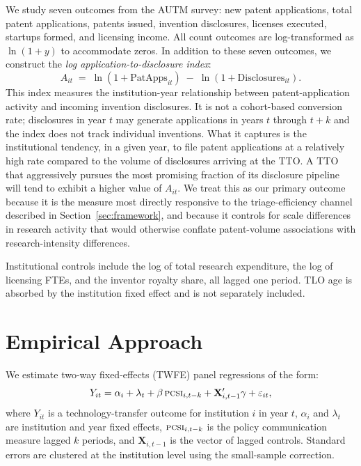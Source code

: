 \documentclass[12pt]{article}
\newcommand{\PCSI}{\textsc{pcsi}}
\begin{document}
We study seven outcomes from the AUTM survey: new patent applications, total patent
applications, patents issued, invention disclosures, licenses executed, startups formed,
and licensing income. All count outcomes are log-transformed as $\ln(1+y)$ to accommodate
zeros. In addition to these seven outcomes, we construct the \emph{log application-to-disclosure
index}:
\begin{equation}
  A_{it} \;=\; \ln(1 + \text{PatApps}_{it}) \;-\; \ln(1 + \text{Disclosures}_{it}).
  \label{eq:index}
\end{equation}
This index measures the institution-year relationship between patent-application activity
and incoming invention disclosures. It is not a cohort-based conversion rate; disclosures
in year $t$ may generate applications in years $t$ through $t+k$ and the index does not
track individual inventions. What it captures is the institutional tendency, in a given
year, to file patent applications at a relatively high rate compared to the volume of
disclosures arriving at the TTO. A TTO that aggressively pursues the most promising
fraction of its disclosure pipeline will tend to exhibit a higher value of $A_{it}$. We
treat this as our primary outcome because it is the measure most directly responsive to
the triage-efficiency channel described in Section~\ref{sec:framework}, and because it
controls for scale differences in research activity that would otherwise conflate
patent-volume associations with research-intensity differences.

Institutional controls include the log of total research expenditure, the log of
licensing FTEs, and the inventor royalty share, all lagged one period. TLO age is
absorbed by the institution fixed effect and is not separately included.

\section{Empirical Approach}
\label{sec:strategy}

We estimate two-way fixed-effects (TWFE) panel regressions of the form:
\begin{equation}
  Y_{it} = \alpha_i + \lambda_t + \beta\,\PCSI{}_{i,t-k} + \mathbf{X}_{i,t-1}'\gamma + \varepsilon_{it},
  \label{eq:twfe}
\end{equation}
where $Y_{it}$ is a technology-transfer outcome for institution $i$ in year $t$,
$\alpha_i$ and $\lambda_t$ are institution and year fixed effects, $\PCSI{}_{i,t-k}$
is the policy communication measure lagged $k$ periods, and $\mathbf{X}_{i,t-1}$ is
the vector of lagged controls. Standard errors are clustered at the institution level
using the \citet{cameron2015} small-sample correction.
\end{document}
